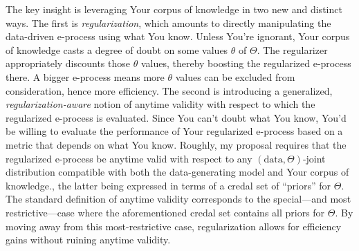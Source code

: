 \documentclass[a4paper, 12pt]{article}
\theoremstyle{plain}
\theoremstyle{definition}
\theoremstyle{remark}
\begin{document}

The key insight is leveraging Your corpus of knowledge in two new and distinct ways.  The first is {\em regularization}, which amounts to directly manipulating the data-driven e-process using what You know.  Unless You're ignorant, Your corpus of knowledge casts a degree of doubt on some values $\theta$ of $\Theta$.  The regularizer appropriately discounts those $\theta$ values, thereby boosting the regularized e-process there.  A bigger e-process means more $\theta$ values can be excluded from consideration, hence more efficiency.  The second is introducing a generalized, {\em regularization-aware} notion of anytime validity with respect to which the regularized e-process is evaluated.  Since You can't doubt what You know, You'd be willing to evaluate the performance of Your regularized e-process based on a metric that depends on what You know.  Roughly, my proposal requires that the regularized e-process be anytime valid with respect to any $(\text{data}, \Theta)$-joint distribution compatible with both the data-generating model and Your corpus of knowledge., the latter being expressed in terms of a credal set of ``priors'' for $\Theta$.  The standard definition of anytime validity corresponds to the special---and most restrictive---case where the aforementioned credal set contains all priors for $\Theta$.  By moving away from this most-restrictive case, regularization allows for efficiency gains without ruining anytime validity. 
\end{document}
